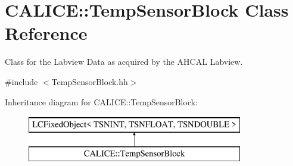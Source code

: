 \section{C\-A\-L\-I\-C\-E\-:\-:Temp\-Sensor\-Block Class Reference}
\label{classCALICE_1_1TempSensorBlock}


Class for the Labview Data as acquired by the A\-H\-C\-A\-L Labview.  




{\ttfamily \#include $<$Temp\-Sensor\-Block.\-hh$>$}

Inheritance diagram for C\-A\-L\-I\-C\-E\-:\-:Temp\-Sensor\-Block\-:\begin{figure}[H]
\begin{center}
\leavevmode
\includegraphics[height=2.000000cm]{classCALICE_1_1TempSensorBlock}
\end{center}
\end{figure}
